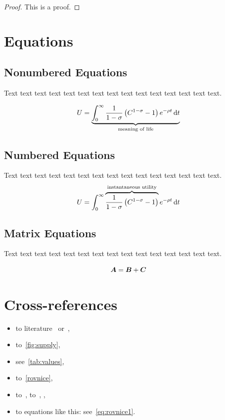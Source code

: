 \begin{proof}
This is a proof.
\end{proof}

\section{Equations}
\label{rovnice}

\subsection{Nonumbered Equations}

Text text text text text text text text text text text text text text text.

    \[ U = \underbrace{\int_0^{\infty} \frac{1}{1-\sigma}\left(C^{1-\sigma} -1 \right) e^{-\rho t} \,\mathrm{d} t}_\text{meaning of life} \]

\subsection{Numbered Equations}

Text text text text text text text text text text text text text text text.
\begin{equation}\label{eq:rovnice1}
    U = \int_0^{\infty} \overbrace{ \frac{1}{1-\sigma}\left(C^{1-\sigma} -1 \right)}^\text{instantaneous utility} e^{-\rho t} \,\mathrm{d} t
\end{equation}

\subsection{Matrix Equations}

Text text text text text text text text text text text text text text text.

\begin{equation}\label{eq:rovnice2}
    \mbox{\boldmath $A$} = \mbox{\boldmath $B$} + \mbox{\boldmath $C$}
\end{equation}

\section{Cross-references}

\begin{itemize}
    \item to literature~\citep[pg.~10]{Bjorvatn2006} 	
            or~\citet[pg.~10]{Haufler2006},
    \item to~\autoref{fig:supply},														%
    \item see~\autoref{tab:values},
    \item to~\autoref{rovnice},
    \item to~, to~,
            , 
    \item to equations like this: see~\eqref{eq:rovnice1}.
\end{itemize}

